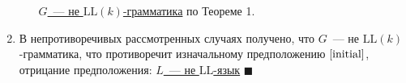\documentclass[a4paper]{article}
\def\LL{{\mathrm{LL}}}
\begin{document}
\begin{enumerate}
\begin{enumerate}
\underline{$G$~--- не $\LL(k)$-грамматика} по Теореме 1.
\end{enumerate}
\item В непротиворечивых рассмотренных случаях получено, что $G$~--- не $\LL(k)$-грамматика, что противоречит изначальному предположению $\ref{initial}$, отрицание предположения: \underline{$L$~--- не $\LL$-язык} $\blacksquare$
\end{enumerate}
\end{document}
